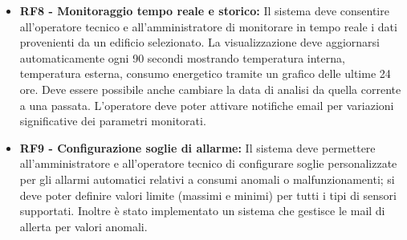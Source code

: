\begin{itemize}
    \item \textbf{RF8 - Monitoraggio tempo reale e storico:} Il sistema deve consentire all'operatore tecnico e all'amministratore di monitorare in tempo reale i dati provenienti da un edificio selezionato. La visualizzazione deve aggiornarsi automaticamente ogni 90 secondi mostrando temperatura interna, temperatura esterna, consumo energetico tramite un grafico delle ultime 24 ore. Deve essere possibile anche cambiare la data di analisi da quella corrente a una passata. L'operatore deve poter attivare notifiche email per variazioni significative dei parametri monitorati.

    \item \textbf{RF9 - Configurazione soglie di allarme:} Il sistema deve permettere all'amministratore e all’operatore tecnico di configurare soglie personalizzate per gli allarmi automatici relativi a consumi anomali o malfunzionamenti; si deve poter definire valori limite (massimi e minimi) per tutti i tipi di sensori supportati. Inoltre è stato implementato un sistema che gestisce le mail di allerta per valori anomali.

\end{itemize}


